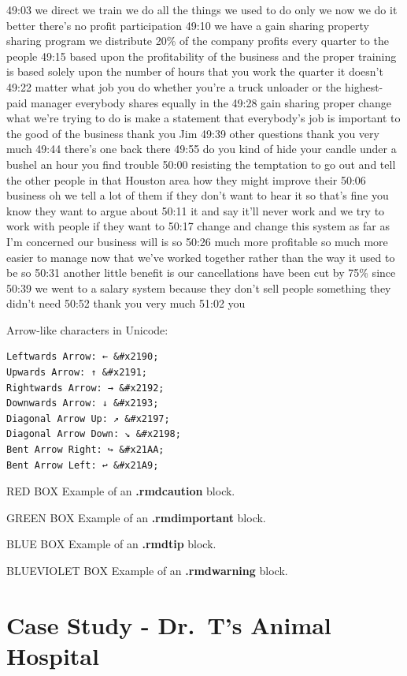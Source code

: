 \documentclass[
]{book}
\begin{document}
49:03
we direct we train we do all the things we used to do only we now we do it better there's no profit participation
49:10
we have a gain sharing property sharing program we distribute 20\% of the company profits every quarter to the people
49:15
based upon the profitability of the business and the proper training is based solely upon the number of hours that you work the quarter it doesn't
49:22
matter what job you do whether you're a truck unloader or the highest-paid manager everybody shares equally in the
49:28
gain sharing proper change what we're trying to do is make a statement that everybody's job is important to the good of the business thank you Jim
49:39
other questions thank you very much
49:44
there's one back there
49:55
do you kind of hide your candle under a bushel an hour you find trouble
50:00
resisting the temptation to go out and tell the other people in that Houston area how they might improve their
50:06
business oh we tell a lot of them if they don't want to hear it so that's fine you know they want to argue about
50:11
it and say it'll never work and we try to work with people if they want to
50:17
change and change this system as far as I'm concerned our business will is so
50:26
much more profitable so much more easier to manage now that we've worked together rather than the way it used to be so
50:31
another little benefit is our cancellations have been cut by 75\% since
50:39
we went to a salary system because they don't sell people something they didn't need
50:52
thank you very much
51:02
you

Arrow-like characters in Unicode:

\begin{verbatim}
Leftwards Arrow: ← &#x2190;
Upwards Arrow: ↑ &#x2191;
Rightwards Arrow: → &#x2192;
Downwards Arrow: ↓ &#x2193;
Diagonal Arrow Up: ↗ &#x2197;
Diagonal Arrow Down: ↘ &#x2198;
Bent Arrow Right: ↪ &#x21AA;
Bent Arrow Left: ↩ &#x21A9;
\end{verbatim}

RED BOX Example of an \textbf{.rmdcaution} block.

GREEN BOX Example of an \textbf{.rmdimportant} block.

BLUE BOX Example of an \textbf{.rmdtip} block.

BLUEVIOLET BOX Example of an \textbf{.rmdwarning} block.

\hypertarget{case-study---dr.-ts-animal-hospital}{%
\chapter{Case Study - Dr.~T's Animal Hospital}\label{case-study---dr.-ts-animal-hospital}}
\end{document}
